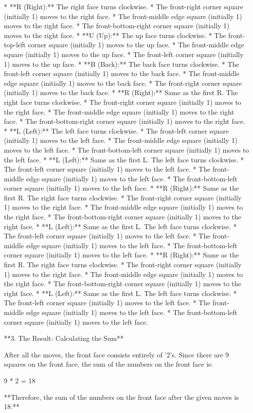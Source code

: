 *   **R (Right):**  The right face turns clockwise.
    *   The front-right corner square (initially 1) moves to the right face.
    *   The front-middle edge square (initially 1) moves to the right face.
    *   The front-bottom-right corner square (initially 1) moves to the right face.
*   **U (Up):** The up face turns clockwise.
    *   The front-top-left corner square (initially 1) moves to the up face.
    *   The front-middle edge square (initially 1) moves to the up face.
    *   The front-left corner square (initially 1) moves to the up face.
*   **B (Back):** The back face turns clockwise.
    *   The front-left corner square (initially 1) moves to the back face.
    *   The front-middle edge square (initially 1) moves to the back face.
    *   The front-right corner square (initially 1) moves to the back face.
*   **R (Right):** Same as the first R.  The right face turns clockwise.
    *   The front-right corner square (initially 1) moves to the right face.
    *   The front-middle edge square (initially 1) moves to the right face.
    *   The front-bottom-right corner square (initially 1) moves to the right face.
*   **L (Left):** The left face turns clockwise.
    *   The front-left corner square (initially 1) moves to the left face.
    *   The front-middle edge square (initially 1) moves to the left face.
    *   The front-bottom-left corner square (initially 1) moves to the left face.
*   **L (Left):** Same as the first L. The left face turns clockwise.
    *   The front-left corner square (initially 1) moves to the left face.
    *   The front-middle edge square (initially 1) moves to the left face.
    *   The front-bottom-left corner square (initially 1) moves to the left face.
*   **R (Right):**  Same as the first R. The right face turns clockwise.
    *   The front-right corner square (initially 1) moves to the right face.
    *   The front-middle edge square (initially 1) moves to the right face.
    *   The front-bottom-right corner square (initially 1) moves to the right face.
*   **L (Left):** Same as the first L. The left face turns clockwise.
    *   The front-left corner square (initially 1) moves to the left face.
    *   The front-middle edge square (initially 1) moves to the left face.
    *   The front-bottom-left corner square (initially 1) moves to the left face.
*    **R (Right):** Same as the first R. The right face turns clockwise.
    *   The front-right corner square (initially 1) moves to the right face.
    *   The front-middle edge square (initially 1) moves to the right face.
    *   The front-bottom-right corner square (initially 1) moves to the right face.
*   **L (Left):** Same as the first L. The left face turns clockwise.
    *   The front-left corner square (initially 1) moves to the left face.
    *   The front-middle edge square (initially 1) moves to the left face.
    *   The front-bottom-left corner square (initially 1) moves to the left face.

**3. The Result: Calculating the Sum**

After all the moves, the front face consists entirely of '2's. Since there are 9 squares on the front face, the sum of the numbers on the front face is:

9 * 2 = 18

**Therefore, the sum of the numbers on the front face after the given moves is 18.**
